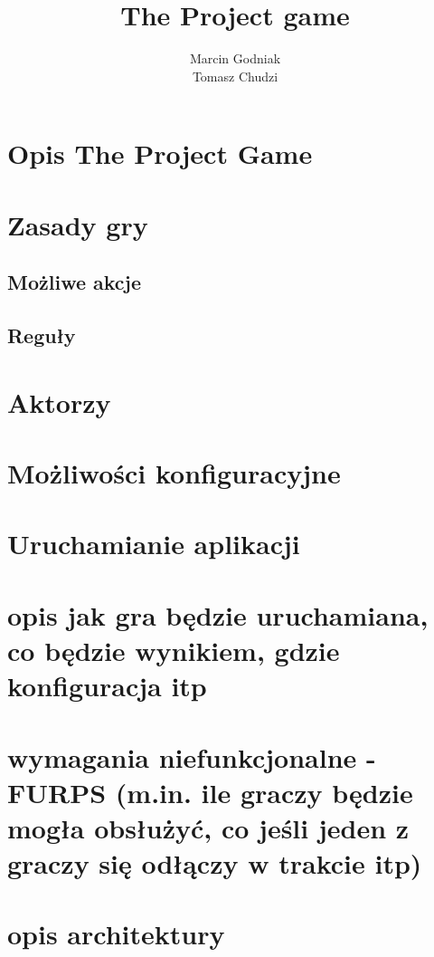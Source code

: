 \documentclass[a4paper]{article}
\title{The Project game}
\author{
Marcin Godniak \\
Tomasz Chudzi\\}
\begin{document}
\maketitle

\pagebreak
\section{Opis The Project Game}



\section{Zasady gry}

\subsection{Możliwe akcje}
\subsection{Reguły}

\section{Aktorzy}

\section{Możliwości konfiguracyjne}

\section{Uruchamianie aplikacji}

\section{opis jak gra będzie uruchamiana, co będzie wynikiem, gdzie konfiguracja itp}

\section{wymagania niefunkcjonalne - FURPS (m.in. ile graczy będzie mogła obsłużyć, co jeśli jeden z graczy się odłączy w trakcie itp)}

\section{ opis architektury}
\end{document}
